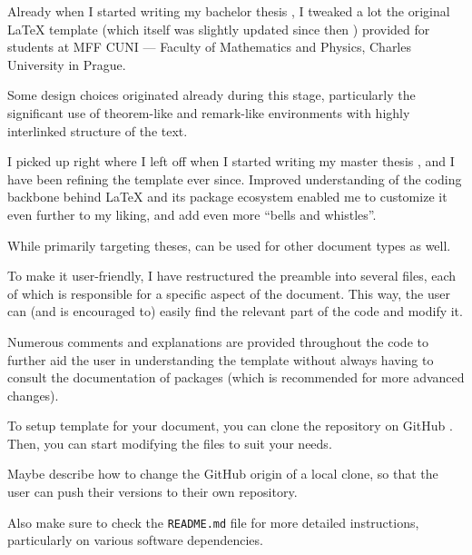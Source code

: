  \label{ch:Introduction}

Already when I started writing my bachelor thesis \autocite{Dujava2022}, I tweaked a lot the original \LaTeX{} template (which itself was slightly updated since then \autocite{MaresTemplate}) provided for students at MFF CUNI --- Faculty of Mathematics and Physics, Charles University in Prague.

Some design choices originated already during this stage, particularly the significant use of theorem-like and remark-like environments with highly interlinked structure of the text.

I picked up right where I left off when I started writing my master thesis \autocite{TODO}, and I have been refining the template ever since.
Improved understanding of the coding backbone behind \LaTeX{} and its package ecosystem enabled me to customize it even further to my liking, and add even more \enquote{bells and whistles}.

\begin{remark}
    While primarily targeting theses, \TeXtured{} can be used for other document types as well.
\end{remark}

To make it user-friendly, I have restructured the preamble into several files, each of which is responsible for a specific aspect of the document.
This way, the user can (and is encouraged to) easily find the relevant part of the code and modify it.

Numerous comments and explanations are provided throughout the code to further aid the user in understanding the template without always having to consult the documentation of packages (which is recommended for more advanced changes).

\begin{remark}
    To setup \TeXtured{} template for your document, you can clone the repository on GitHub \autocite{TeXtured}.
    Then, you can start modifying the files to suit your needs.
    \begin{Todo}
        Maybe describe how to change the GitHub origin of a local clone, so that the user can push their versions to their own repository.
    \end{Todo}
    Also make sure to check the \texttt{README.md} file for more detailed instructions, particularly on various software dependencies.
\end{remark}

